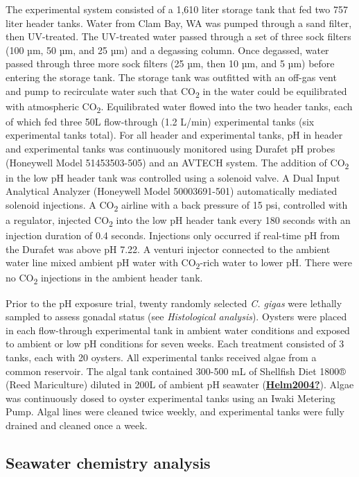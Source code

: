 \documentclass [11pt, proquest] {uwthesis}[2015/03/03]
\begin{document}
The experimental system consisted of a 1,610 liter storage tank that fed two 757 liter header tanks. Water from Clam Bay, WA was pumped through a sand filter, then UV-treated. The UV-treated water passed through a set of three sock filters (100 µm, 50 µm, and 25 µm) and a degassing column. Once degassed, water passed through three more sock filters (25 µm, then 10 µm, and 5 µm) before entering the storage tank. The storage tank was outfitted with an off-gas vent and pump to recirculate water such that CO\textsubscript{2} in the water could be equilibrated with atmospheric CO\textsubscript{2}. Equilibrated water flowed into the two header tanks, each of which fed three 50L flow-through (1.2 L/min) experimental tanks (six experimental tanks total). For all header and experimental tanks, pH in header and experimental tanks was continuously monitored using Durafet pH probes (Honeywell Model 51453503-505) and an AVTECH system. The addition of CO\textsubscript{2} in the low pH header tank was controlled using a solenoid valve. A Dual Input Analytical Analyzer (Honeywell Model 50003691-501) automatically mediated solenoid injections. A CO\textsubscript{2} airline with a back pressure of 15 psi, controlled with a regulator, injected CO\textsubscript{2} into the low pH header tank every 180 seconds with an injection duration of 0.4 seconds. Injections only occurred if real-time pH from the Durafet was above pH 7.22. A venturi injector connected to the ambient water line mixed ambient pH water with CO\textsubscript{2}-rich water to lower pH. There were no CO\textsubscript{2} injections in the ambient header tank.

Prior to the pH exposure trial, twenty randomly selected \emph{C. gigas} were lethally sampled to assess gonadal status (see \emph{Histological analysis}). Oysters were placed in each flow-through experimental tank in ambient water conditions and exposed to ambient or low pH conditions for seven weeks. Each treatment consisted of 3 tanks, each with 20 oysters. All experimental tanks received algae from a common reservoir. The algal tank contained 300-500 mL of Shellfish Diet 1800® (Reed Mariculture) diluted in 200L of ambient pH seawater (\protect\hyperlink{ref-Helm2004}{\textbf{Helm2004?}}). Algae was continuously dosed to oyster experimental tanks using an Iwaki Metering Pump. Algal lines were cleaned twice weekly, and experimental tanks were fully drained and cleaned once a week.

\hypertarget{seawater-chemistry-analysis}{%
\subsection{Seawater chemistry analysis}\label{seawater-chemistry-analysis}}
\end{document}
